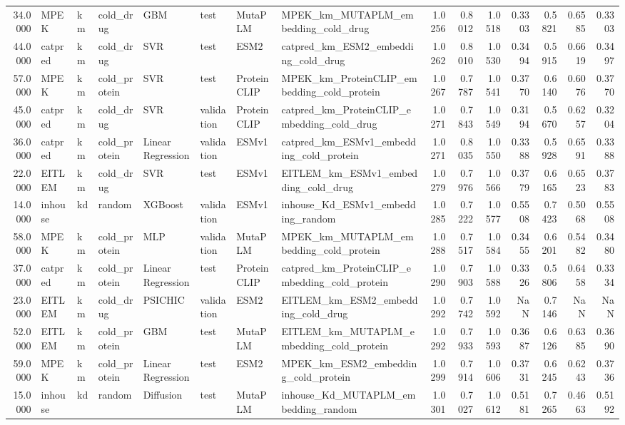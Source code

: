 \begin{tabular}{rlllllllrrrrrrr}
34.0000 & MPEK & km & cold_drug & GBM & test & MutaPLM & MPEK_km_MUTAPLM_embedding_cold_drug & 1.0256 & 0.8012 & 1.0518 & 0.3303 & 0.5821 & 0.6585 & 0.3303 \\
44.0000 & catpred & km & cold_drug & SVR & test & ESM2 & catpred_km_ESM2_embedding_cold_drug & 1.0262 & 0.8010 & 1.0530 & 0.3494 & 0.5915 & 0.6619 & 0.3497 \\
57.0000 & MPEK & km & cold_protein & SVR & test & ProteinCLIP & MPEK_km_ProteinCLIP_embedding_cold_protein & 1.0267 & 0.7787 & 1.0541 & 0.3770 & 0.6140 & 0.6076 & 0.3770 \\
45.0000 & catpred & km & cold_drug & SVR & validation & ProteinCLIP & catpred_km_ProteinCLIP_embedding_cold_drug & 1.0271 & 0.7843 & 1.0549 & 0.3194 & 0.5670 & 0.6257 & 0.3204 \\
36.0000 & catpred & km & cold_protein & Linear Regression & validation & ESMv1 & catpred_km_ESMv1_embedding_cold_protein & 1.0271 & 0.8035 & 1.0550 & 0.3388 & 0.5928 & 0.6591 & 0.3388 \\
22.0000 & EITLEM & km & cold_drug & SVR & test & ESMv1 & EITLEM_km_ESMv1_embedding_cold_drug & 1.0279 & 0.7976 & 1.0566 & 0.3779 & 0.6165 & 0.6523 & 0.3783 \\
14.0000 & inhouse & kd & random & XGBoost & validation & ESMv1 & inhouse_Kd_ESMv1_embedding_random & 1.0285 & 0.7222 & 1.0577 & 0.5508 & 0.7423 & 0.5068 & 0.5508 \\
58.0000 & MPEK & km & cold_protein & MLP & validation & MutaPLM & MPEK_km_MUTAPLM_embedding_cold_protein & 1.0288 & 0.7517 & 1.0584 & 0.3455 & 0.6201 & 0.5482 & 0.3480 \\
37.0000 & catpred & km & cold_protein & Linear Regression & test & ProteinCLIP & catpred_km_ProteinCLIP_embedding_cold_protein & 1.0290 & 0.7903 & 1.0588 & 0.3326 & 0.5806 & 0.6458 & 0.3334 \\
23.0000 & EITLEM & km & cold_drug & PSICHIC & validation & ESM2 & EITLEM_km_ESM2_embedding_cold_drug & 1.0292 & 0.7742 & 1.0592 & NaN & 0.7146 & NaN & NaN \\
52.0000 & EITLEM & km & cold_protein & GBM & test & MutaPLM & EITLEM_km_MUTAPLM_embedding_cold_protein & 1.0292 & 0.7933 & 1.0593 & 0.3687 & 0.6126 & 0.6385 & 0.3690 \\
59.0000 & MPEK & km & cold_protein & Linear Regression & test & ESM2 & MPEK_km_ESM2_embedding_cold_protein & 1.0299 & 0.7914 & 1.0606 & 0.3731 & 0.6245 & 0.6243 & 0.3736 \\
15.0000 & inhouse & kd & random & Diffusion & test & MutaPLM & inhouse_Kd_MUTAPLM_embedding_random & 1.0301 & 0.7027 & 1.0612 & 0.5181 & 0.7265 & 0.4663 & 0.5192 \\

\end{tabular}
